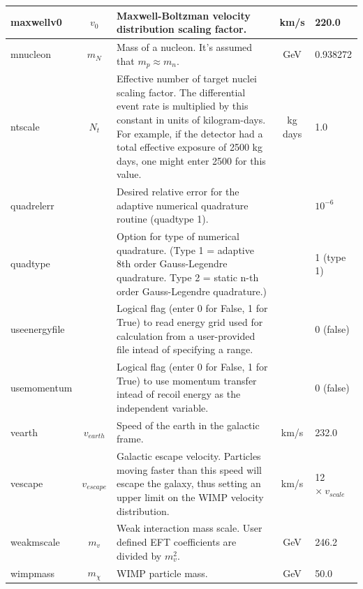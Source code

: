 \documentclass[11pt]{article}
\begin{document}
\begin{longtable}{| l | c | p{2.5in} | c | l | }
  \hline maxwellv0 & $v_0$ & Maxwell-Boltzman velocity distribution scaling factor. &
  km/s & 220.0 \\

  \hline mnucleon & $m_N$ & Mass of a nucleon. It's assumed that $m_p\approx m_n$. &
  GeV & 0.938272 \\

  \hline ntscale & $N_t$ & Effective number of target nuclei scaling factor. The
  differential event rate is multiplied by this constant in units of
  kilogram-days. For example, if the detector had a total effective exposure of
  2500 kg days, one might enter 2500 for this value. & kg days & 1.0 \\
  
  \hline quadrelerr &  & Desired relative error for the adaptive numerical quadrature routine (quadtype 1).  & & $10^{-6}$\\
  
  \hline quadtype & & Option for type of numerical quadrature. (Type 1 = adaptive 8th order Gauss-Legendre quadrature.  Type 2 = static n-th order Gauss-Legendre quadrature.) && 1 (type 1)\\

  \hline useenergyfile & & Logical flag (enter 0 for False, 1 for True) to read energy
  grid used for calculation from a user-provided file intead of specifying a
  range. & & 0 (false) \\

  \hline usemomentum & & Logical flag (enter 0 for False, 1 for True) to use momentum
  transfer intead of recoil energy as the independent variable. & &0 (false) \\

  \hline vearth & $v_{earth}$ & Speed of the earth in the galactic frame. & km/s & 
  232.0\\

  \hline vescape & $v_{escape}$ & Galactic escape velocity. Particles moving faster than
  this speed will escape the galaxy, thus setting an upper limit on the WIMP
  velocity distribution. & km/s & 12 $\times\ v_{scale}$ \\

  \hline weakmscale & $m_v$ & Weak interaction mass scale. User defined EFT coefficients
  are divided by $m_v^2$. & GeV & 246.2 \\

  \hline wimpmass & $m_\chi$ & WIMP particle mass. & GeV & 50.0\\
  \hline
\end{longtable}
\end{document}
